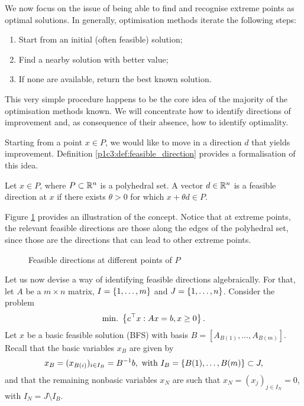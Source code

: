 We now focus on the issue of being able to find and recognise extreme points as optimal solutions. In generally, optimisation methods iterate the following steps:
%
\begin{enumerate}
	\item Start from an initial (often feasible) solution;
	\item Find a nearby solution with better value;
	\item If none are available, return the best known solution.	
\end{enumerate}
%
This very simple procedure happens to be the core idea of the majority of the optimisation methods known. We will concentrate how to identify directions of improvement and, as consequence of their absence, how to identify optimality.

Starting from a point $x \in P$, we would like to move in a direction $d$ that yields improvement. Definition \ref{p1c3:def:feasible_direction} provides a formalisation of this idea.

\begin{definition} \label{p1c3:def:feasible_direction}
	Let $x \in P$, where $P \subset \mathbb{R}^n$ is a polyhedral set. A vector $d \in \mathbb{R}^n$ is a feasible direction at $x$ if there exists $\theta > 0$ for which $x + \theta d \in P$.
\end{definition}

Figure \ref{p1c3:fig:feasible_directions} provides an illustration of the concept. Notice that at extreme points, the relevant feasible directions are those along the edges of the polyhedral set, since those are the directions that can lead to other extreme points.
  
\begin{figure}[h]
	\caption{Feasible directions at different points of $P$} \label{p1c3:fig:feasible_directions}
\end{figure}

Let us now devise a way of identifying feasible directions algebraically. For that, let $A$ be a $m \times n$ matrix, $I = \left\{ 1,\dots,m \right \}$ and $J = \left\{ 1,\dots,n \right \}$. Consider the problem 
%
\begin{equation*}
	\mathop{\text{min.~}} \left\{ c^\top x : Ax = b, x \geq 0 \right \}.	
\end{equation*}
%
Let $x$ be a basic feasible solution (BFS) with basis $B = [A_{B(1)}, \dots, A_{B(m)}]$. Recall that the basic variables $x_B$ are given by
%
\begin{equation*}
	x_B = (x_{B(i)})_{i \in I_B} = B^{-1}b, \text{ with } I_B = \left\{ B(1), \dots, B(m) \right \} \subset J,	
\end{equation*}
%
and that the remaining nonbasic variables $x_N$ are such that $x_N = (x_j)_{j \in I_N} = 0$, with $I_N = J \setminus I_B$.

